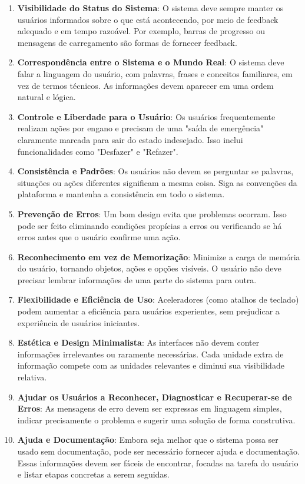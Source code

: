 \begin{enumerate}
    \item \textbf{Visibilidade do Status do Sistema}: O sistema deve sempre manter os usuários informados sobre o que está acontecendo, por meio de feedback adequado e em tempo razoável. Por exemplo, barras de progresso ou mensagens de carregamento são formas de fornecer feedback.

    \item \textbf{Correspondência entre o Sistema e o Mundo Real}: O sistema deve falar a linguagem do usuário, com palavras, frases e conceitos familiares, em vez de termos técnicos. As informações devem aparecer em uma ordem natural e lógica.

    \item \textbf{Controle e Liberdade para o Usuário}: Os usuários frequentemente realizam ações por engano e precisam de uma "saída de emergência" claramente marcada para sair do estado indesejado. Isso inclui funcionalidades como "Desfazer" e "Refazer".

    \item \textbf{Consistência e Padrões}: Os usuários não devem se perguntar se palavras, situações ou ações diferentes significam a mesma coisa. Siga as convenções da plataforma e mantenha a consistência em todo o sistema.

    \item \textbf{Prevenção de Erros}: Um bom design evita que problemas ocorram. Isso pode ser feito eliminando condições propícias a erros ou verificando se há erros antes que o usuário confirme uma ação.

    \item \textbf{Reconhecimento em vez de Memorização}: Minimize a carga de memória do usuário, tornando objetos, ações e opções visíveis. O usuário não deve precisar lembrar informações de uma parte do sistema para outra.

    \item \textbf{Flexibilidade e Eficiência de Uso}: Aceleradores (como atalhos de teclado) podem aumentar a eficiência para usuários experientes, sem prejudicar a experiência de usuários iniciantes.

    \item \textbf{Estética e Design Minimalista}: As interfaces não devem conter informações irrelevantes ou raramente necessárias. Cada unidade extra de informação compete com as unidades relevantes e diminui sua visibilidade relativa.

    \item \textbf{Ajudar os Usuários a Reconhecer, Diagnosticar e Recuperar-se de Erros}: As mensagens de erro devem ser expressas em linguagem simples, indicar precisamente o problema e sugerir uma solução de forma construtiva.

    \item \textbf{Ajuda e Documentação}: Embora seja melhor que o sistema possa ser usado sem documentação, pode ser necessário fornecer ajuda e documentação. Essas informações devem ser fáceis de encontrar, focadas na tarefa do usuário e listar etapas concretas a serem seguidas.
\end{enumerate}

